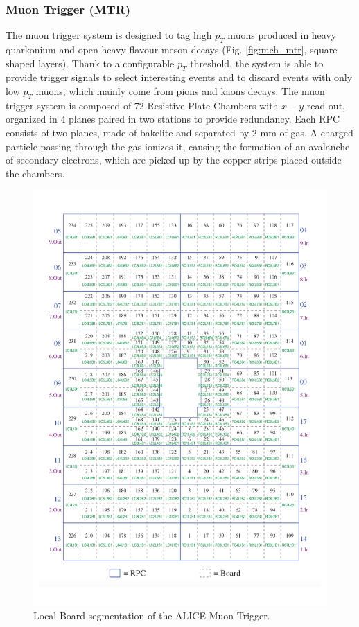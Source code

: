 \subsubsection{Muon Trigger (MTR)}
The muon trigger system is designed to tag high $p_T$ muons produced in heavy quarkonium and open heavy flavour meson decays (Fig. \ref{fig:mch_mtr}, square shaped layers).
Thank to a configurable $p_T$ threshold, the system is able to provide trigger signals to select interesting events and to discard events with only low $p_T$ muons, which mainly come from pions and kaons decays.
The muon trigger system is composed of 72 Resistive Plate Chambers with $x-y$ read out, organized in $4$ planes paired in two stations to provide redundancy.
Each RPC consists of two planes, made of bakelite and separated by $2$ mm of gas.
A charged particle passing through the gas ionizes it, causing the formation of an avalanche of secondary electrons, which are picked up by the copper strips placed outside the chambers.

\begin{figure}[!h]
\begin{center}
\includegraphics[width=0.65\linewidth]{Chapters/Introduction/Figs/LB.pdf}
\caption{Local Board segmentation of the ALICE Muon Trigger.}
\label{fig:LB}
\end{center}
\end{figure}

